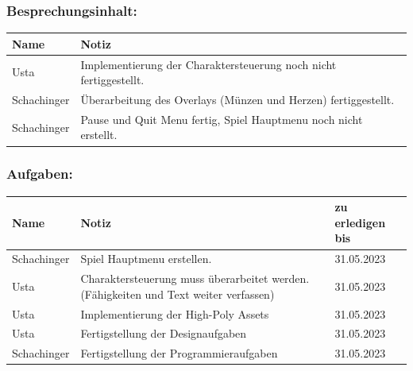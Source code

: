 \subsubsection*{Besprechungsinhalt:}
\begin{tabular}{|m{}|m{}|}
\hline
Name & Notiz \\
\hline
Usta & Implementierung der Charaktersteuerung noch nicht fertiggestellt. \\
\hline
Schachinger & Überarbeitung des Overlays (Münzen und Herzen) fertiggestellt. \\
\hline
Schachinger & Pause und Quit Menu fertig, Spiel Hauptmenu noch nicht erstellt. \\
\hline
\end{tabular}

\subsubsection*{Aufgaben:}
\begin{tabular}{|m{}|m{}|m{}|}
\hline
Name & Notiz & zu erledigen bis \\
\hline
Schachinger & Spiel Hauptmenu erstellen. & 31.05.2023 \\
\hline
Usta & Charaktersteuerung muss überarbeitet werden. (Fähigkeiten und Text weiter verfassen) & 31.05.2023 \\
\hline
Usta & Implementierung der High-Poly Assets & 31.05.2023 \\
\hline
Usta & Fertigstellung der Designaufgaben & 31.05.2023 \\
\hline
Schachinger & Fertigstellung der Programmieraufgaben & 31.05.2023 \\
\hline
\end{tabular}


\pagebreak

